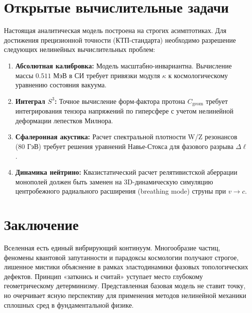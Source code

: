 \documentclass[12pt,a4paper]{article}
\begin{document}
\section{Открытые вычислительные задачи}
Настоящая аналитическая модель построена на строгих асимптотиках. Для достижения прецизионной точности (КТП-стандарта) необходимо разрешение следующих нелинейных вычислительных проблем:
\begin{enumerate}
    \item \textbf{Абсолютная калибровка:} Модель масштабно-инвариантна. Вычисление массы $0.511$ МэВ в СИ требует привязки модуля $\kappa$ к космологическому уравнению состояния вакуума.
    \item \textbf{Интеграл $S^3$:} Точное вычисление форм-фактора протона $C_{\text{geom}}$ требует интегрирования тензора напряжений по гиперсфере с учетом нелинейной деформации лепестков Милнора.
    \item \textbf{Сфалеронная акустика:} Расчет спектральной плотности W/Z резонансов (80 ГэВ) требует решения уравнений Навье-Стокса для фазового разрыва $\Delta \ell$.
    \item \textbf{Динамика нейтрино:} Квазистатический расчет релятивистской аберрации монополей должен быть заменен на 3D-динамическую симуляцию центробежного радиального расширения (breathing mode) струны при $v \to c$.
\end{enumerate}

\section*{Заключение}
Вселенная есть единый вибрирующий континуум. Многообразие частиц, феномены квантовой запутанности и парадоксы космологии получают строгое, лишенное мистики объяснение в рамках эластодинамики фазовых топологических дефектов. Принцип «заткнись и считай» уступает место глубокому геометрическому детерминизму. Представленная базовая модель не ставит точку, но очерчивает ясную перспективу для применения методов нелинейной механики сплошных сред в фундаментальной физике.
\end{document}
